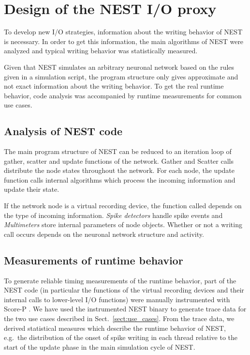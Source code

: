 \documentclass[]{YIC2015}
\begin{document}
\section{Design of the NEST I/O proxy}

To develop new I/O strategies, information about the writing behavior
of NEST is necessary. In order to get this information, the main
algorithms of NEST were analyzed and typical writing behavior was
statistically measured.

Given that NEST simulates an arbitrary neuronal network based on the
rules given in a simulation script, the program structure only gives
approximate and not exact information about the writing behavior. To
get the real runtime behavior, code analysis was accompanied by runtime
measurements for common use cases.

\subsection{Analysis of NEST code}

The main program structure of NEST can be reduced to an iteration loop
of gather, scatter and update functions of the network. Gather and
Scatter calls distribute the node states throughout the network. For
each node, the update function calls internal algorithms which process
the incoming information and update their state.

If the network node is a virtual recording device, the function called
depends on the type of incoming information. \emph{Spike detectors}
handle spike events and \emph{Multimeters} store internal parameters
of node objects. Whether or not a writing call occurs depends on the
neuronal network structure and activity.

\subsection{Measurements of runtime behavior}

To generate reliable timing measurements of the runtime behavior, part
of the NEST code (in particular the functions of the virtual recording
devices and their internal calls to lower-level I/O functions) were
manually instrumented with Score-P \cite{ScoreP}.
%
We have used the instrumented NEST binary to generate trace data for the
two use cases described in Sect.~\ref{sect:use_cases}.
From the trace data, we derived
statistical measures which describe the runtime behavior of NEST,
e.g.~the distribution of the onset of spike writing in each thread
relative to the start of the update phase in the main simulation cycle
of NEST.
\end{document}
